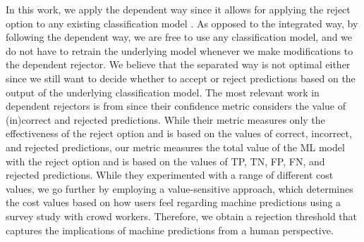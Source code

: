 In this work, we apply the dependent way since it allows for applying the reject option to any existing classification model \citep{hendrickx2021machine}.
%
As opposed to the integrated way, by following the dependent way, we are free to use any classification model, and we do not have to retrain the underlying model whenever we make modifications to the dependent rejector.
%
We believe that the separated way is not optimal either since we still want to decide whether to accept or reject predictions based on the output of the underlying classification model.
%
The most relevant work in dependent rejectors is from \citet{de2000reject} since their confidence metric considers the value of (in)correct and rejected predictions.
%
While their metric measures only the effectiveness of the reject option and is based on the values of correct, incorrect, and rejected predictions, our metric measures the total value of the ML model with the reject option and is based on the values of TP, TN, FP, FN, and rejected predictions.
%
While they experimented with a range of different cost values, we go further by employing a value-sensitive approach, which determines the cost values based on how users feel regarding machine predictions using a survey study with crowd workers.
%
Therefore, we obtain a rejection threshold that captures the implications of machine predictions from a human perspective.

